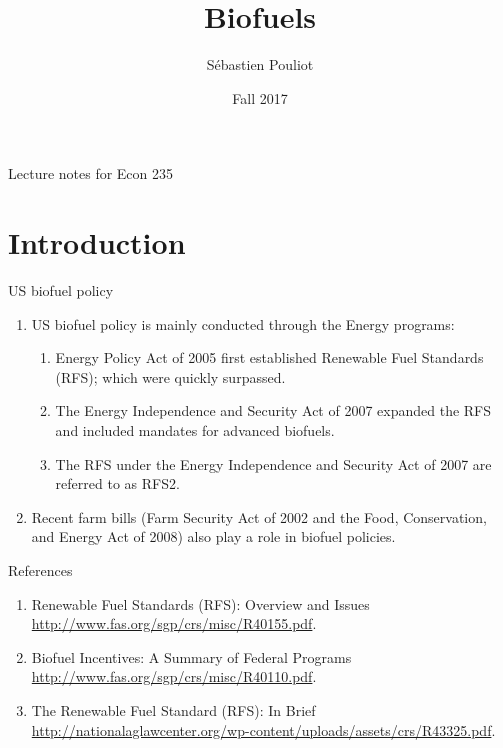 \documentclass[table,xcolor=pdftex,dvipsnames]{beamer}\usepackage[]{graphicx}\usepackage[]{color}
\title[Biofuels]{Biofuels}
\author[Pouliot]{S\'{e}bastien Pouliot}
\institute{Iowa State University}
\date{Fall 2017}
\begin{document}

\begin{frame}
\titlepage
\vspace{-0.4in}
\begin{center}
Lecture notes for Econ 235\\
\end{center}
\end{frame}

\section{Introduction}

\begin{frame}{US biofuel policy}
\begin{enumerate}[label=\textbullet]
  \item US biofuel policy is mainly conducted through the Energy programs:
        \begin{enumerate}[label=-]
          \item Energy Policy Act of 2005 first established Renewable Fuel Standards (RFS); which were quickly surpassed.
          \item The Energy Independence and Security Act of 2007 expanded the RFS and included mandates for advanced biofuels.
          \item The RFS under the Energy Independence and Security Act of 2007 are referred to as RFS2.
      \end{enumerate}
  \item Recent farm bills (Farm Security Act of 2002 and the Food, Conservation, and Energy Act of 2008) also play a role in biofuel policies.
\end{enumerate}
\end{frame}


\begin{frame}{References}
\begin{enumerate}[label=\textbullet]
    \item Renewable Fuel Standards (RFS): Overview and Issues \url{http://www.fas.org/sgp/crs/misc/R40155.pdf}.
    \item Biofuel Incentives: A Summary of Federal Programs \url{http://www.fas.org/sgp/crs/misc/R40110.pdf}.
    \item The Renewable Fuel Standard (RFS): In Brief \url{http://nationalaglawcenter.org/wp-content/uploads/assets/crs/R43325.pdf}.
\end{enumerate}
\end{frame}
\end{document}
